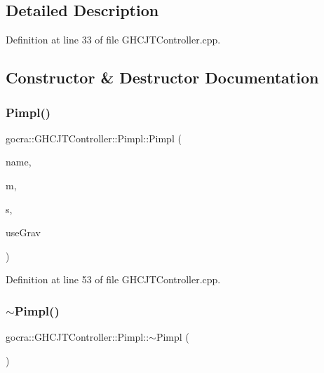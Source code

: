 \subsection{Detailed Description}


Definition at line 33 of file G\+H\+C\+J\+T\+Controller.\+cpp.



\subsection{Constructor \& Destructor Documentation}
\hypertarget{structgocra_1_1GHCJTController_1_1Pimpl_ad9ff86db7b59559d42a4d87eee73c761}{}\label{structgocra_1_1GHCJTController_1_1Pimpl_ad9ff86db7b59559d42a4d87eee73c761} 
\subsubsection{\texorpdfstring{Pimpl()}{Pimpl()}}
{\footnotesize\ttfamily gocra\+::\+G\+H\+C\+J\+T\+Controller\+::\+Pimpl\+::\+Pimpl (\begin{DoxyParamCaption}\item[{const std\+::string \&}]{name,  }\item[{Model \&}]{m,  }\item[{\hyperlink{classocra_1_1OneLevelSolver}{ocra\+::\+One\+Level\+Solver} \&}]{s,  }\item[{bool}]{use\+Grav }\end{DoxyParamCaption})\hspace{0.3cm}{\ttfamily [inline]}}



Definition at line 53 of file G\+H\+C\+J\+T\+Controller.\+cpp.

\hypertarget{structgocra_1_1GHCJTController_1_1Pimpl_a0df04a7ffd9f5bc6346fc786d1c30ef1}{}\label{structgocra_1_1GHCJTController_1_1Pimpl_a0df04a7ffd9f5bc6346fc786d1c30ef1} 
\subsubsection{\texorpdfstring{$\sim$\+Pimpl()}{~Pimpl()}}
{\footnotesize\ttfamily gocra\+::\+G\+H\+C\+J\+T\+Controller\+::\+Pimpl\+::$\sim$\+Pimpl (\begin{DoxyParamCaption}{ }\end{DoxyParamCaption})\hspace{0.3cm}{\ttfamily [inline]}}



